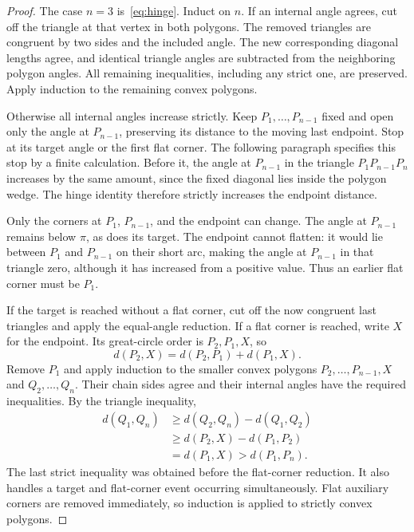 \begin{proof}
The case $n=3$ is~\eqref{eq:hinge}. Induct on $n$. If an internal
angle agrees, cut off the triangle at that vertex in both polygons.
The removed triangles are congruent by two sides and the included
angle. The new corresponding diagonal lengths agree, and identical
triangle angles are subtracted from the neighboring polygon angles.
All remaining inequalities, including any strict one, are preserved.
Apply induction to the remaining convex polygons.

Otherwise all internal angles increase strictly. Keep
$P_1,\ldots,P_{n-1}$ fixed and open only the angle at $P_{n-1}$,
preserving its distance to the moving last endpoint. Stop at its
target angle or the first flat corner. The following paragraph
specifies this stop by a finite calculation. Before it, the angle
at $P_{n-1}$ in the triangle $P_1P_{n-1}P_n$ increases by the same
amount, since the fixed diagonal lies inside the polygon wedge.
The hinge identity therefore strictly increases the endpoint distance.

Only the corners at $P_1$, $P_{n-1}$, and the endpoint can change.
The angle at $P_{n-1}$ remains below $\pi$, as does its target.
The endpoint cannot flatten: it would lie between $P_1$ and
$P_{n-1}$ on their short arc, making the angle at $P_{n-1}$ in that
triangle zero, although it has increased from a positive value.
Thus an earlier flat corner must be $P_1$.

If the target is reached without a flat corner, cut off the now
congruent last triangles and apply the equal-angle reduction. If a
flat corner is reached, write $X$ for the endpoint. Its great-circle
order is $P_2,P_1,X$, so
\[
 d(P_2,X)=d(P_2,P_1)+d(P_1,X).
\]
Remove $P_1$ and apply induction to the smaller convex polygons
$P_2,\ldots,P_{n-1},X$ and $Q_2,\ldots,Q_n$. Their chain sides agree
and their internal angles have the required inequalities. By the
triangle inequality,
\begin{align*}
 d(Q_1,Q_n)&\geq d(Q_2,Q_n)-d(Q_1,Q_2)\\
 &\geq d(P_2,X)-d(P_1,P_2)\\
 &=d(P_1,X)>d(P_1,P_n).
\end{align*}
The last strict inequality was obtained before the flat-corner
reduction. It also handles a target and flat-corner event occurring
simultaneously. Flat auxiliary corners are removed immediately, so
induction is applied to strictly convex polygons.
\end{proof}

